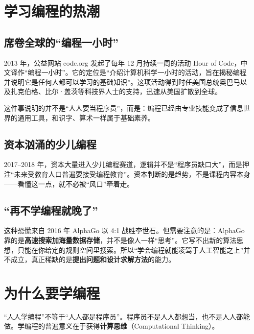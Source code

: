 ﻿%
\lstset{language=C}

\section{学习编程的热潮}

\subsection{席卷全球的“编程一小时”}

2013 年，公益网站 code.org 发起了每年 12 月持续一周的活动 Hour of Code，中文译作“编程一小时”。它的定位是“介绍计算机科学一小时的活动，旨在揭秘编程并说明它是任何人都可以学习的基础知识”。这项活动得到时任美国总统奥巴马以及扎克伯格、比尔·盖茨等科技界人士的支持，迅速从美国扩散到全球。

这件事说明的并不是“人人要当程序员”，而是：编程已经由专业技能变成了信息世界的通用工具，和识字、算术一样属于基础素养。

\subsection{资本汹涌的少儿编程}

2017--2018 年，资本大量进入少儿编程赛道，逻辑并不是“程序员缺口大”，而是押注“未来受教育人口普遍要接受编程教育”。资本判断的是趋势，不是课程内容本身——看懂这一点，就不必被“风口”牵着走。

\subsection{“再不学编程就晚了”}

这种恐慌来自 2016 年 AlphaGo 以 4:1 战胜李世石。但需要注意的是：AlphaGo 靠的是\textbf{高速搜索加海量数据存储}，并不是像人一样“思考”。它写不出新的算法思想，只能在你给定的规则空间里搜索。所以“学会编程就能凌驾于人工智能之上”并不成立，真正稀缺的是\textbf{提出问题和设计求解方法}的能力。


\section{为什么要学编程}

“人人学编程”不等于“人人都是程序员”。程序员不是人人都想当，也不是人人都能做。学编程的普遍意义在于获得\textbf{计算思维}（Computational Thinking）。

